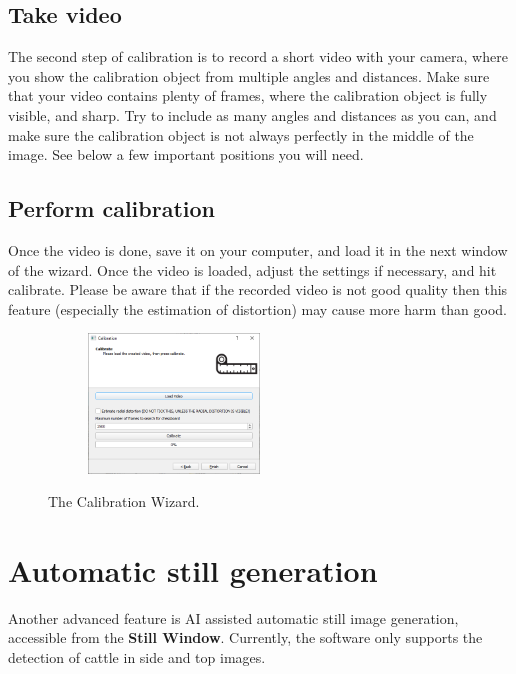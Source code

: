 \documentclass[10pt,a4paper,oneside]{report}             %
\begin{document}
\subsection{Take video}

The second step of calibration is to record a short video with your camera, where you show the calibration object from multiple angles and distances. Make sure that your video contains plenty of frames, where the calibration object is fully visible, and sharp. Try to include as many angles and distances as you can, and make sure the calibration object is not always perfectly in the middle of the image. See below a few important positions you will need. 

\subsection{Perform calibration}

Once the video is done, save it on your computer, and load it in the next window of the wizard. Once the video is loaded, adjust the settings if necessary, and hit calibrate. Please be aware that if the recorded video is not good quality then this feature (especially the estimation of distortion) may cause more harm than good.

\begin{figure}[H]
	\centering
	\begin{subfigure}{\textwidth}
		\centering 
		\includegraphics[width=0.5\textwidth]{./images/Calib.png}
	\end{subfigure}
	\caption[]
	{\small  The Calibration Wizard.}
\end{figure} 

\section{Automatic still generation}

Another advanced feature is AI assisted automatic still image generation, accessible from the \textbf{Still Window}. Currently, the software only supports the detection of cattle in side and top images.
\end{document}
